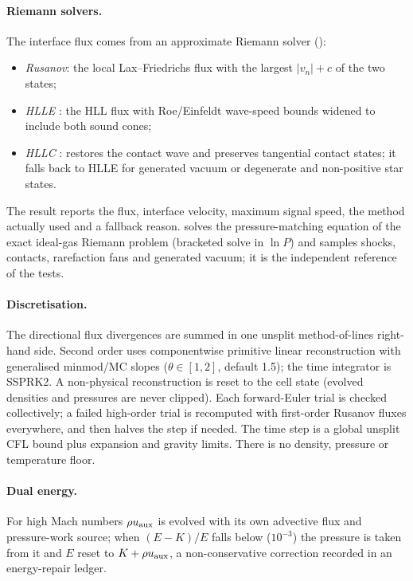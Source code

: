 \paragraph*{Riemann solvers.} The interface flux comes from an approximate Riemann solver ():
\begin{itemize}
\item \emph{Rusanov}: the local Lax--Friedrichs flux with the largest $|v_n|+c$ of the two states;
\item \emph{HLLE} \cite{Harten1983,Einfeldt1988}: the HLL flux with Roe/Einfeldt wave-speed bounds widened to include
      both sound cones;
\item \emph{HLLC} \cite{Toro1994}: restores the contact wave and preserves tangential contact states; it falls back to
      HLLE for generated vacuum or degenerate and non-positive star states.
\end{itemize}
The result reports the flux, interface velocity, maximum signal speed, the method actually used and a fallback reason.
 solves the pressure-matching equation of the exact ideal-gas Riemann problem (bracketed solve in
$\ln P$) and samples shocks, contacts, rarefaction fans and generated vacuum; it is the independent reference of the
tests.

\paragraph*{Discretisation.} The directional flux divergences are summed in one unsplit method-of-lines right-hand
side. Second order uses componentwise primitive linear reconstruction with generalised minmod/MC slopes
($\theta\in[1,2]$, default 1.5); the time integrator is SSPRK2. A non-physical reconstruction is reset to the cell
state (evolved densities and pressures are never clipped). Each forward-Euler trial is checked collectively; a failed
high-order trial is recomputed with first-order Rusanov fluxes everywhere, and  then halves the
step if needed. The time step is a global unsplit CFL bound plus expansion and gravity limits. There is no density,
pressure or temperature floor.

\paragraph*{Dual energy.} For high Mach numbers $\rho u_{\rm aux}$ is evolved with its own advective flux and
pressure-work source; when $(E-K)/E$ falls below  ($10^{-3}$) the pressure is taken from it and
$E$ reset to $K+\rho u_{\rm aux}$, a non-conservative correction recorded in an energy-repair ledger.

